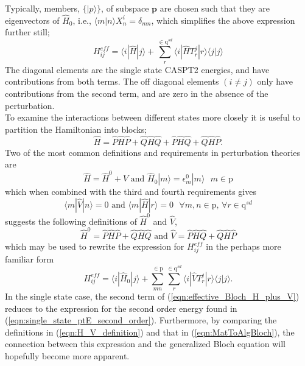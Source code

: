 \documentclass[12pt]{article}
\begin{document}
\noindent Typically, members, $\{|p\rangle \}$, of subspace $\mathbf{p}$ are chosen such that they are 
eigenvectors of $\hat{H}_{0}$, i.e., $\langle m | n \rangle X^{i}_{n} = \delta_{mn}$,
which simplifies the above expression further still; 
\begin{equation}
H^{eff}_{ij} = 
\langle i | \hat{H} | j \rangle
+\sum_{r}^{\in \mathrm{q}^{sd}}
\langle i | \hat{H} T^{j}_{r} |r \rangle\langle j | j \rangle
\label{eqn:effective_Bloch_summation_explicit_diag}
\end{equation}
The diagonal elements are the single state CASPT2 energies, and have contributions from both terms.
The off diagonal elements $(i \neq j)$ only have contributions from the second term, 
and are zero in the absence of the perturbation. \\

\noindent To examine the interactions between different states more closely it is useful to partition the Hamiltonian into blocks;
\begin{equation*}
\hat{H} = 
\hat{P}\hat{H}\hat{P}+ \hat{Q}\hat{H}\hat{Q}+ 
\hat{P}\hat{H}\hat{Q}+ \hat{Q}\hat{H}\hat{P}.
\end{equation*}
\noindent Two of the most common definitions and requirements in perturbation theories are
\begin{equation*}
\hat{H} = \hat{H}^{0}+\hat{V} 
\text{ \ \ \ and \ \ \ }
\hat{H}_{0} |m \rangle = \epsilon^{0}_{m}|m\rangle \text{ \ \ } m \in \mathrm{p} 
\end{equation*}
which when combined with the third and fourth requirements gives
\begin{equation}
\langle m| \hat{V} |n \rangle = 0 
\text{ \ \ and  \ \ }
\langle m| \hat{H} |r \rangle = 0 \text{ \ \ } \forall m,n \in \mathrm{p} \text{,\ \ } \forall r \in \mathrm{q}^{sd} 
\label{eqn:V_H_are_same_def}
\end{equation}
suggests the following definitions of $\hat{H}^{0}$ and $\hat{V}$,
\begin{equation}
\hat{H}^{0}  = \hat{P}\hat{H}\hat{P}+ \hat{Q}\hat{H}\hat{Q}
\text{ \ \ \ and \ \ \ } \hat{V}  =  \hat{P}\hat{H}\hat{Q}+ \hat{Q}\hat{H}\hat{P}
\label{eqn:H_V_definition}
\end{equation}
which may be used to rewrite the expression for $H^{eff}_{ij}$ in the perhaps more familiar form
\begin{equation}
H^{eff}_{ij} =  
\langle i | \hat{H}_{0} | j \rangle
+\sum_{mn}^{\in \mathrm{p} }\sum_{r}^{\in \mathrm{q}^{sd}}
\langle i | \hat{V} T^{j}_{r} |r \rangle\langle j | j \rangle.
\label{eqn:effective_Bloch_H_plus_V}
\end{equation}
In the single state case, the second term of (\ref{eqn:effective_Bloch_H_plus_V}) reduces to the
expression for the second order energy found in (\ref{eqn:single_state_ptE_second_order}). Furthermore, by comparing 
the definitions in (\ref{eqn:H_V_definition}) and that in (\ref{eqn:MatToAlgBloch}), the
connection between this expression and the generalized Bloch equation will hopefully become 
more apparent.\\
\end{document}
